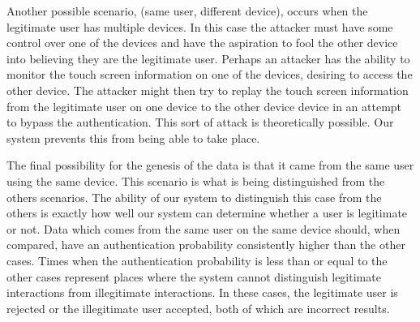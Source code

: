 
Another possible scenario,
(same user, different device),
occurs 
when the legitimate user has multiple devices.
In this case the attacker must have some control over
one of the devices and 
have the aspiration to fool the other device
into believing they are the legitimate user.
%
Perhaps an attacker has the ability to 
monitor the touch screen information
on one of the devices, desiring to access the other device. 
The attacker might then 
try to replay the touch screen information 
from the legitimate user on one device
to the other device device
in an attempt to bypass the authentication.
%
This sort of attack is theoretically possible.
Our system prevents this from being able to take place.
%

The final possibility for the genesis of 
the data is that it came from
the same user using the same device.
%
This scenario is what is being
distinguished from the others scenarios.
The ability of our system to distinguish
this case from the others is
exactly how well our system can determine
whether a user is legitimate or not.
%
Data which comes from the same user on the same device
should, when compared, have an authentication probability
consistently higher than the other cases.
Times when the authentication probability is less than or equal to the other cases
represent places where the system cannot distinguish
legitimate interactions from illegitimate interactions.
%
In these cases,
the legitimate user is rejected 
or the illegitimate user accepted,
both of which are incorrect results.
%


